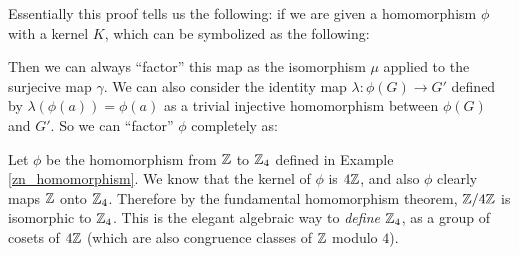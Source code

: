 Essentially this proof tells us the following: if we are given a homomorphism $\phi$ with a kernel $K$, which can be symbolized as the following:

\begin{center}
\end{center}

Then we can always ``factor'' this map as the isomorphism $\mu$ applied to the surjecive map $\gamma$. We can also consider the identity map $\lambda: \phi(G) \to G'$ defined by $\lambda(\phi(a)) = \phi(a)$ as a trivial injective homomorphism between $\phi(G)$ and $G'$. So we can ``factor'' $\phi$ completely as:

\begin{center}
\end{center}

\begin{example}
Let $\phi$ be the homomorphism from $\z$ to $\zn[4]$ defined in Example \ref{zn_homomorphism}. We know that the kernel of $\phi$ is $4\z$, and also $\phi$ clearly maps $\z$ onto $\zn[4]$. Therefore by the fundamental homomorphism theorem, $\z/4\z$ is isomorphic to $\zn[4]$. This is the elegant algebraic way to \textit{define} $\zn[4]$, as a group of cosets of $4\z$ (which are also congruence classes of $\z$ modulo $4$).
\end{example}

